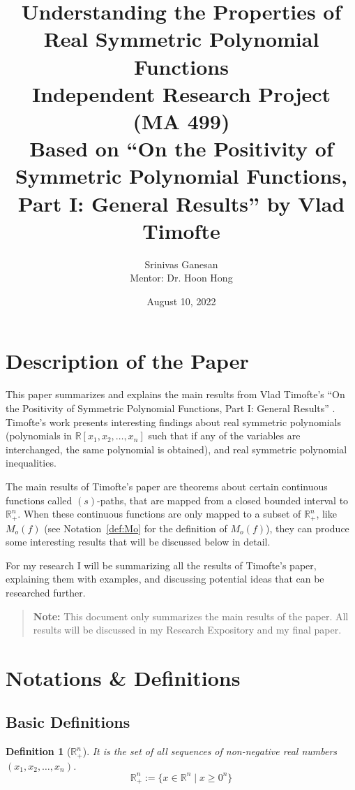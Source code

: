 \documentclass[12pt]{article}
\title{Understanding the Properties of Real Symmetric Polynomial Functions\\
\large Independent Research Project (MA 499)\\
\normalsize Based on ``On the Positivity of Symmetric Polynomial Functions, Part I: General Results'' by Vlad Timofte}
\author{Srinivas Ganesan\\
\small Mentor: Dr. Hoon Hong}
\date{August 10, 2022}
\newtheorem{definition}{Definition}
\theoremstyle{definition}
\begin{document}
\maketitle

\section{Description of the Paper}

This paper summarizes and explains the main results from Vlad Timofte's ``On the Positivity of Symmetric Polynomial Functions, Part I: General Results'' \cite{timofte2003}. Timofte's work presents interesting findings about real symmetric polynomials (polynomials in $\mathbb{R}[x_1, x_2, \ldots, x_n]$ such that if any of the variables are interchanged, the same polynomial is obtained), and real symmetric polynomial inequalities.

The main results of Timofte's paper are theorems about certain continuous functions called $(s)$-paths, that are mapped from a closed bounded interval to $\mathbb{R}^n_+$. When these continuous functions are only mapped to a subset of $\mathbb{R}^n_+$, like $M_o(f)$ (see Notation~\ref{def:Mo} for the definition of $M_o(f)$), they can produce some interesting results that will be discussed below in detail.

For my research I will be summarizing all the results of Timofte's paper, explaining them with examples, and discussing potential ideas that can be researched further.

\begin{quote}
\textbf{Note:} This document only summarizes the main results of the paper. All results will be discussed in my Research Expository and my final paper.
\end{quote}

\section{Notations \& Definitions}
\label{sec:notations}

\subsection{Basic Definitions}

\begin{definition}[$\mathbb{R}^n_+$]\label{def:Rn+}
It is the set of all sequences of non-negative real numbers $(x_1, x_2, \ldots, x_n)$.
\[
\mathbb{R}^n_+ := \{x \in \mathbb{R}^n \mid x \geq 0^n\}
\]
\end{definition}
\end{document}
